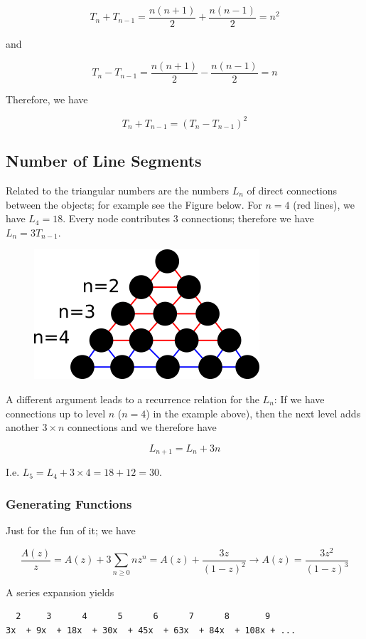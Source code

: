 \[ T_n + T_{n-1} = \frac{n(n+1)}{2} + \frac{n(n-1)}{2}  = n^2\]

and

\[ T_{n} - T_{n-1} = \frac{n(n+1)}{2} - \frac{n(n-1)}{2}  = n \]

Therefore, we have

\[ T_n + T_{n-1} = (T_{n} - T_{n-1})^2 \]

\subsection{Number of Line Segments}

Related to the triangular numbers are the numbers $L_n$ of direct connections between the objects; for example see the Figure below. For $n=4$ (red lines), we have $L_4 = 18$. Every node contributes
$3$ connections; therefore we have $L_n = 3 T_{n-1}$.


\begin{figure}[H]
\centering
\includegraphics[scale=0.7]{images/triangular_numbers_3.png}
\end{figure}

A different argument leads to a recurrence relation for the $L_n$: If we have connections up to level $n$ ($n=4$) in the example above), then the next level adds another $3 \times n$ connections and we therefore have

\[ L_{n+1} = L_n + 3n\]

I.e. $L_5 = L_4 + 3 \times 4 = 18 + 12 = 30$.

\subsubsection{Generating Functions}

Just for the fun of it; we have

\[ \frac{A(z)}{z} = A(z) + 3 \sum_{n \geq 0} n z^n = A(z) + \frac{3z}{(1-z)^2} \rightarrow A(z) = \frac{3z^2}{(1-z)^3}\]

A series expansion yields

\begin{verbatim}
  2     3      4      5      6      7      8       9
3x  + 9x  + 18x  + 30x  + 45x  + 63x  + 84x  + 108x + ...
\end{verbatim}
